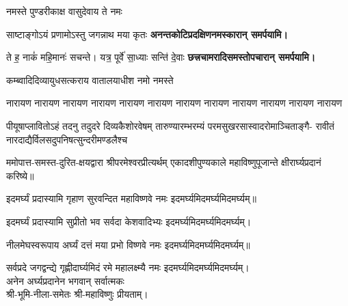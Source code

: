 \begin{center}
{नमस्ते पुण्डरीकाक्ष वासुदेवाय ते नमः}

{साष्टाङ्गोऽयं प्रणामोऽस्तु जगन्नाथ मया कृतः}
\textbf{\devAya{} अनन्तकोटिप्रदक्षिणनमस्कारान् समर्पयामि।}
\medskip

{ते ह॒ नाकं॑ महि॒मानः॑ सचन्ते। यत्र॒ पूर्वे॑ सा॒ध्याः सन्ति॑ दे॒वाः}
\textbf{\devAya{} छत्त्रचामरादिसमस्तोपचारान् समर्पयामि।}
\medskip
\end{center}

\begin{center}
\begingroup
\let\sect\dnsub


{कम्ब्वादिदिव्यायुधसत्कराय वातालयाधीश नमो नमस्ते}

{नारायण नारायण नारायण नारायण}
{नारायण नारायण नारायण नारायण}
{नारायण नारायण नारायण नारायण}

{पीयूषाप्लावितोऽहं तदनु तदुदरे दिव्यकैशोरवेषम्}
{तारुण्यारम्भरम्यं परमसुखरसास्वादरोमाञ्चिताङ्गै-}
{रावीतं नारदाद्यैर्विलसदुपनिषत्सुन्दरीमण्डलैश्च}

\endgroup

ममोपात्त-समस्त-दुरित-क्षयद्वारा श्रीपरमेश्वरप्रीत्यर्थम् एकादशीपुण्यकाले महाविष्णुपूजान्ते क्षीरार्घ्यप्रदानं करिष्ये॥
\medskip

{इदमर्घ्यं प्रदास्यामि गृहाण सुरवन्दित}
\hfill महाविष्णवे नमः इदमर्घ्यमिदमर्घ्यमिदमर्घ्यम्॥\medskip

{इदमर्घ्यं प्रदास्यामि सुप्रीतो भव सर्वदा}
\hfill केशवादिभ्यः इदमर्घ्यमिदमर्घ्यमिदमर्घ्यम्।\medskip

{नीलमेघस्वरूपाय अर्घ्यं दत्तं मया प्रभो}
\hfill विष्णवे नमः इदमर्घ्यमिदमर्घ्यमिदमर्घ्यम्॥\medskip

{सर्वप्रदे जगद्वन्द्ये गृह्णीदार्घ्यमिदं रमे}
\hfill महालक्ष्म्यै नमः इदमर्घ्यमिदमर्घ्यमिदमर्घ्यम्।\\
अनेन अर्घ्यप्रदानेन भगवान् सर्वात्मकः\\ श्री-भूमि-नीला-समेतः श्री-महाविष्णुः प्रीयताम्।\medskip



\end{center}
